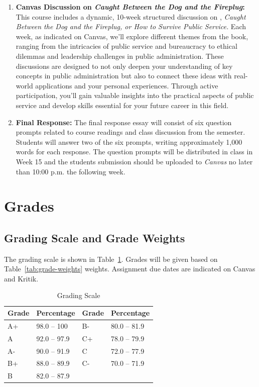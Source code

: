 \documentclass[10pt, letterpaper]{article}
\begin{document}
\begin{enumerate}
		\item \textbf{Canvas Discussion on \emph{Caught Between the Dog and the Fireplug}:} This course includes a dynamic, 10-week structured discussion on \cite{ASHWORTH2001}, \emph{Caught Between the Dog and the Fireplug, or How to Survive Public Service.} Each week, as indicated on Canvas, we'll explore different themes from the book, ranging from the intricacies of public service and bureaucracy to ethical dilemmas and leadership challenges in public administration. These discussions are designed to not only deepen your understanding of key concepts in public administration but also to connect these ideas with real-world applications and your personal experiences. Through active participation, you'll gain valuable insights into the practical aspects of public service and develop skills essential for your future career in this field.
		
		\item \textbf{Final Response:} The final response essay will consist of six question prompts related to course readings and class discussion from the semester. Students will answer two of the six prompts, writing approximately 1,000 words for each response. The question prompts will be distributed in class in Week 15 and the students submission should be uploaded to \emph{Canvas} no later than 10:00 p.m. the following week. 
	\end{enumerate}

    \section*{Grades}

    \subsection*{Grading Scale and Grade Weights}  
    The grading scale is shown in Table~\ref{tab:grading-scale}. Grades will be given based on Table~\ref{tab:grade-weights} weights. Assignment due dates are indicated on Canvas and Kritik. 
    
    \begin{table}[ht]
    \centering
    \caption{Grading Scale}
    \begin{tabular}{llll}
    \toprule
    \textbf{Grade} & \textbf{Percentage} & \textbf{Grade} & \textbf{Percentage} \\
    \midrule
    A+ & 98.0 – 100 & B- & 80.0 – 81.9\\
    A & 92.0 – 97.9 & C+ & 78.0 – 79.9\\
    A- & 90.0 – 91.9 & C & 72.0 – 77.9\\
    B+ & 88.0 – 89.9 & C- & 70.0 – 71.9\\
    B & 82.0 – 87.9 & & \\
    \bottomrule
    \end{tabular}
    \label{tab:grading-scale}
    \end{table}
    
\end{document}
